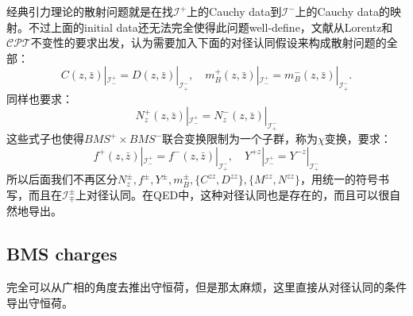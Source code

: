 经典引力理论的散射问题就是在找$\mathcal{I}^+$上的Cauchy data到$\mathcal{I}^-$上的Cauchy data的映射。不过上面的initial data还无法完全使得此问题well-define，文献\cite{Strominger:2013jfa}从Lorentz和${\mathcal{CPT}}$不变性的要求出发，认为需要加入下面的对径认同假设来构成散射问题的全部：
\begin{equation}
	C(z,\bar{z})|_{\mathcal{I}_{-}^{+}}=D(z,\bar{z})|_{\mathcal{I}_{+}^{-}},\quad m^+_{B}(z,\bar{z})|_{\mathcal{I}_{-}^{+}}=m^-_{B}(z,\bar{z})|_{\mathcal{I}_{+}^{-}}.
\end{equation}
同样也要求\cite{Kapec:2014opa}：
\begin{equation}
	N^+_{z}(z,\bar{z})|_{\mathcal{I}_{-}^{+}}=N^-_{z}(z,\bar{z})|_{\mathcal{I}_{+}^{-}}
\end{equation}
这些式子也使得$BMS^+\times BMS^-$联合变换限制为一个子群，称为$\chi$变换\cite{Kapec:2014opa}，要求：
\begin{equation}
	f^+(z,\bar z)|_{\mathcal{I}^+_-}=f^-(z,\bar z)|_{\mathcal{I}^-_+},\quad Y^{+z}|_{\mathcal{I}^+_-}=Y^{-z}|_{\mathcal{I}^-_+}
\end{equation}
所以后面我们不再区分$N_z^{\pm},f^{\pm},Y^{\pm},m_B^{\pm},\{C^{zz},D^{zz}\},\{M^{zz},N^{zz}\}$，用统一的符号书写，而且在$\mathcal{I}^{\pm}_{\mp}$上对径认同。在QED中，这种对径认同也是存在的，而且可以很自然地导出。
\subsection{BMS charges}
完全可以从广相的角度去推出守恒荷，但是那太麻烦，这里直接从对径认同的条件导出守恒荷。

